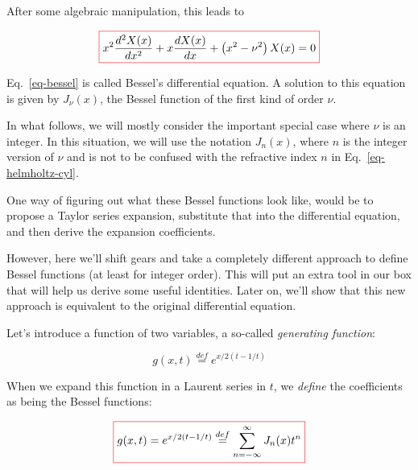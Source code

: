 After some algebraic manipulation, this leads to

\begin{equation}
\fbox{$\displaystyle
x^2\frac{d^2 X(x)}{d x^2} + x \frac{d X(x)}{d x} + \left(x ^ 2 - \nu^2 \right)X(x) = 0 \label{eq-bessel}
$}
\end{equation}

\noindent{}Eq.~\ref{eq-bessel} is called Bessel's differential equation. A solution to this equation is given by $J_\nu(x)$, the Bessel function of the first kind of order $\nu$.

In what follows, we will mostly consider the important special case where $\nu$ is an integer. In this situation, we will use the notation $J_n(x)$, where $n$ is the integer version of $\nu$ and is not to be confused with the refractive index $n$ in Eq.~\ref{eq-helmholtz-cyl}.


\pagebreak



One way of figuring out what these Bessel functions look like, would be to propose a Taylor series expansion, substitute that into the differential equation, and then derive the expansion coefficients.

However, here we'll shift gears and take a completely different approach to define Bessel functions (at least for integer order). This will put an extra tool in our box that will help us derive some useful identities. Later on, we'll show that this new approach is equivalent to the original differential equation.

\noindent{}Let's introduce a function of two variables, a so-called \emph{generating function}:

\begin{equation}
g(x,t) \stackrel{def}{=} e^{x/2(t-1/t)} \label{eq-gen-bessel}
\end{equation}

When we expand this function in a Laurent series in $t$, we \emph{define} the coefficients as being the Bessel functions:

\begin{equation}
\fbox{$\displaystyle
 g(x,t) =   e^{x/2(t-1/t)}  \stackrel{def}{=} \sum_{n = - \infty}^{\infty} J_n(x)t^n
    $}
  \label{eq-g-bessel}
\end{equation}


